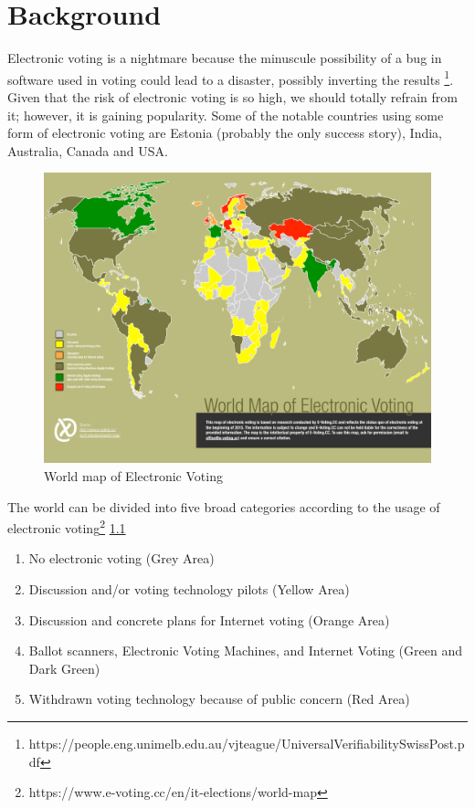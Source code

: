 \chapter{Background}
\label{cha:background}



   Electronic voting is a nightmare because the minuscule possibility of 
   a bug in software used in voting could lead to a disaster, possibly 
   inverting the results
   \footnote{https://people.eng.unimelb.edu.au/vjteague/UniversalVerifiabilitySwissPost.pdf}.
   Given that the risk of  electronic voting is 
   so high, we should totally refrain from it; however,
   it is gaining popularity. Some of the notable countries using some form
   of electronic voting are Estonia (probably the only success story), India,
   Australia, Canada and USA. 
    \begin{figure}[htb]
	\begin{center}
	\includegraphics[scale=0.5]{e-voting_worldmap_2015.pdf}
	\caption{World map of Electronic Voting}
	\label{fig:world_electronic_voting_map}
	\end{center}
  \end{figure}  
   
  The world can be divided into five broad categories according to 
  the usage of electronic voting\footnote{https://www.e-voting.cc/en/it-elections/world-map}
  \ref{fig:world_electronic_voting_map}
  \begin{enumerate}
  \item No electronic voting (Grey Area)
  \item Discussion and/or voting technology pilots (Yellow Area)
  \item Discussion and concrete plans for Internet voting (Orange Area)
  \item Ballot scanners, Electronic Voting Machines, and Internet Voting
        (Green and Dark Green)
  \item Withdrawn voting technology because of public concern (Red Area) 
  \end{enumerate}    
  
